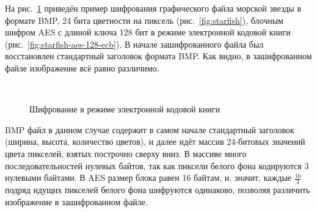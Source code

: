 На рис.~\ref{fig:ecb-demo} приведён пример шифрования графического файла морской звезды в формате BMP, 24 бита цветности на пиксель (рис.~\ref{fig:starfish}), блочным шифром AES с длиной ключа 128 бит в режиме электронной кодовой книги (рис.~\ref{fig:starfish-aes-128-ecb}). В начале зашифрованного файла был восстановлен стандартный заголовок формата BMP. Как видно, в зашифрованном файле изображение всё равно различимо.
\begin{figure}[!ht]
    \centering
    ~~~
    \caption{Шифрование в режиме электронной кодовой книги\label{fig:ecb-demo}}
\end{figure}
BMP файл в данном случае содержит в самом начале стандартный заголовок (ширина, высота, количество цветов), и далее идёт массив 24-битовых значений цвета пикселей, взятых построчно сверху вниз. В массиве много последовательностей нулевых байтов, так как пиксели белого фона кодируются 3 нулевыми байтами. В AES размер блока равен 16 байтам, и, значит, каждые $\frac{16}{3}$ подряд идущих пикселей белого фона шифруются одинаково, позволяя различить изображение в зашифрованном файле.


